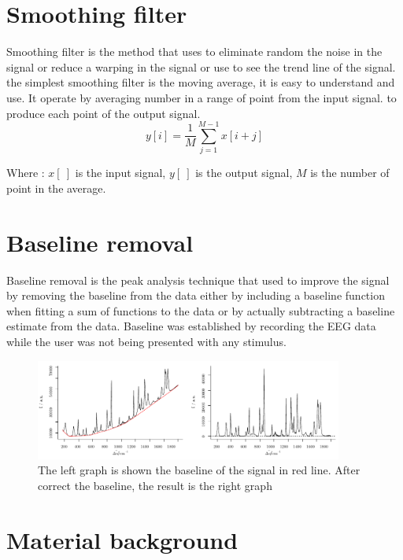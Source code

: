 \section{Smoothing filter}
\hspace{1.5cm}Smoothing filter is the method that uses to eliminate random the noise in the signal or reduce a warping in the signal or use to see the trend line of the signal. the simplest smoothing filter is the moving average, it is easy to understand and use. It operate by averaging number in a range of point from the input signal. to produce each point of the output signal. \\
\begin{equation}\label{eq:win}
	 y[i] = \frac{1}{M}\sum\limits ^{M-1}_{j=1} x[i+j]
\end{equation}

Where : $x[~]$ is the input signal, $y[~]$ is the output signal,
	   $M$ is the number of point in the average.

\section{Baseline removal}
\hspace{1.5cm} Baseline removal is the peak analysis technique that used to improve the signal by removing the baseline from the data either by including a baseline function when fitting a sum of functions to the data or by actually subtracting a baseline estimate from the data. Baseline was established by recording the EEG data while the user was not being presented with any stimulus. \\

\begin{figure}[ht]
	\centering
	\includegraphics[width=0.9\textwidth]{chapter3/baseline.pdf}
	\caption{The left graph is shown the baseline of the signal in red line. After correct the baseline, the result is the right graph\cite{base}}
	\label{fig:base}
\end{figure}

\newpage
\section{Material background}

